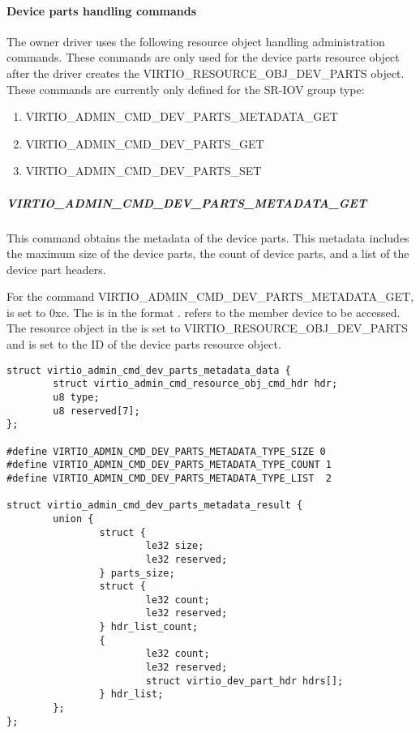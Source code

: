 \paragraph{Device parts handling commands}\label{par:Basic Facilities of a Virtio Device / Device groups / Group administration commands / Device parts / Device parts handling commands}

The owner driver uses the following resource object handling administration
commands. These commands are only used for the device parts resource
object after the driver creates the VIRTIO_RESOURCE_OBJ_DEV_PARTS object.
These commands are currently only defined for the SR-IOV group type:

\begin{enumerate}
\item VIRTIO_ADMIN_CMD_DEV_PARTS_METADATA_GET
\item VIRTIO_ADMIN_CMD_DEV_PARTS_GET
\item VIRTIO_ADMIN_CMD_DEV_PARTS_SET
\end{enumerate}

\subparagraph{VIRTIO_ADMIN_CMD_DEV_PARTS_METADATA_GET}
\label{par:Basic Facilities of a Virtio Device / Device groups / Group administration commands / Device parts / Device parts handling commands / VIRTIO-ADMIN-CMD-DEV-PARTS-METADATA-GET}

This command obtains the metadata of the device parts. This metadata includes
the maximum size of the device parts, the count of device parts, and a list of
the device part headers.

For the command VIRTIO_ADMIN_CMD_DEV_PARTS_METADATA_GET,  is set
to 0xe. The  is in the format
.
 refers to the member device to be accessed.
The resource object  in the  is set to
VIRTIO_RESOURCE_OBJ_DEV_PARTS and  is set to the ID of the
device parts resource object.

\begin{lstlisting}
struct virtio_admin_cmd_dev_parts_metadata_data {
        struct virtio_admin_cmd_resource_obj_cmd_hdr hdr;
        u8 type;
        u8 reserved[7];
};

#define VIRTIO_ADMIN_CMD_DEV_PARTS_METADATA_TYPE_SIZE 0
#define VIRTIO_ADMIN_CMD_DEV_PARTS_METADATA_TYPE_COUNT 1
#define VIRTIO_ADMIN_CMD_DEV_PARTS_METADATA_TYPE_LIST  2

struct virtio_admin_cmd_dev_parts_metadata_result {
        union {
                struct {
                        le32 size;
                        le32 reserved;
                } parts_size;
                struct {
                        le32 count;
                        le32 reserved;
                } hdr_list_count;
                {
                        le32 count;
                        le32 reserved;
                        struct virtio_dev_part_hdr hdrs[];
                } hdr_list;
        };
};
\end{lstlisting}

